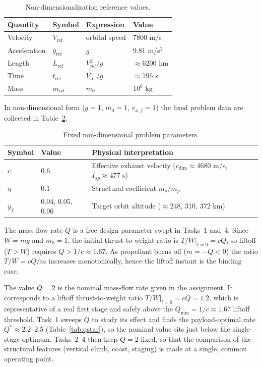 \documentclass[../main.tex]{subfiles}
\begin{document}
\begin{table}[H]
\centering
\caption{Non-dimensionalization reference values.}
\label{tab:nondim}
\begin{tabular}{llll}
\toprule
Quantity     & Symbol              & Expression              & Value \\
\midrule
Velocity     & $V_\mathrm{ref}$   & orbital speed           & 7800 m/s \\
Acceleration & $g_\mathrm{ref}$   & $g$                     & 9.81 m/s$^2$ \\
Length       & $L_\mathrm{ref}$   & $V_\mathrm{ref}^2/g$    & $\approx 6200$ km \\
Time         & $t_\mathrm{ref}$   & $V_\mathrm{ref}/g$      & $\approx 795$ s \\
Mass         & $m_\mathrm{ref}$   & $m_0$                   & $10^6$ kg \\
\bottomrule
\end{tabular}
\end{table}

In non-dimensional form ($g = 1$, $m_0 = 1$, $v_{x,f} = 1$) the fixed problem data are collected in Table~\ref{tab:params}.

\begin{table}[H]
\centering
\caption{Fixed non-dimensional problem parameters.}
\label{tab:params}
\begin{tabular}{llp{8.3cm}}
\toprule
Symbol   & Value             & Physical interpretation \\
\midrule
$c$      & 0.6               & Effective exhaust velocity ($c_\mathrm{dim} \approx 4680$ m/s, $I_{sp} \approx 477$ s) \\
$\eta$   & 0.1               & Structural coefficient $m_s/m_p$ \\
$y_f$    & 0.04, 0.05, 0.06  & Target orbit altitude ($\approx 248$, 310, 372 km) \\
\bottomrule
\end{tabular}
\end{table}

The mass-flow rate $Q$ is a free design parameter swept in Tasks~1 and~4. Since $W = mg$ and $m_0 = 1$, the initial thrust-to-weight ratio is $\left.T/W\right|_{t=0} = cQ$, so liftoff ($T > W$) requires $Q > 1/c \approx 1.67$. As propellant burns off ($\dot{m} = -Q < 0$) the ratio $T/W = cQ/m$ increases monotonically, hence the liftoff instant is the binding case.

The value $Q = 2$ is the nominal mass-flow rate given in the assignment. It corresponds to a liftoff thrust-to-weight ratio $\left.T/W\right|_{t=0} = cQ = 1.2$, which is representative of a real first stage and safely above the $Q_{\min} = 1/c \approx 1.67$ liftoff threshold. Task~1 sweeps $Q$ to study its effect and finds the payload-optimal rate $Q^\ast \approx 2.2$--$2.5$ (Table~\ref{tab:qstar}), so the nominal value sits just below the single-stage optimum. Tasks~2--4 then keep $Q = 2$ fixed, so that the comparison of the structural features (vertical climb, coast, staging) is made at a single, common operating point.
\end{document}
